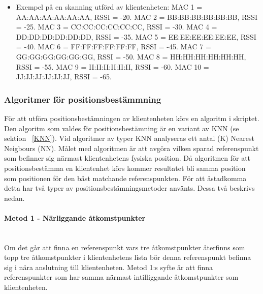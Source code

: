 \documentclass[a4paper,12pt]{article}
\begin{document}
   \begin{itemize}
   \item Exempel på en skanning utförd av klientenheten:
         \newline MAC 1 = AA:AA:AA:AA:AA:AA,  RSSI = -20.
         \newline MAC 2 = BB:BB:BB:BB:BB:BB,  RSSI = -25.
         \newline MAC 3 = CC:CC:CC:CC:CC:CC,  RSSI = -30.
         \newline MAC 4 = DD:DD:DD:DD:DD:DD,  RSSI = -35.
         \newline MAC 5 = EE:EE:EE:EE:EE:EE,  RSSI = -40.
         \newline MAC 6 = FF:FF:FF:FF:FF:FF,  RSSI = -45.
         \newline MAC 7 = GG:GG:GG:GG:GG:GG,  RSSI = -50.
         \newline MAC 8 = HH:HH:HH:HH:HH:HH,  RSSI = -55.
         \newline MAC 9 = II:II:II:II:II:II,  RSSI = -60.
         \newline MAC 10 = JJ:JJ:JJ:JJ:JJ:JJ,  RSSI = -65.
   \end{itemize}

 \subsubsection{Algoritmer för positionsbestämmning}\label{algoritm}
 För att utföra positionsbestämningen av klientenheten körs en algoritm i skriptet. Den algoritm som valdes för positionsbestämning är en variant av KNN (se sektion ~\ref{KNN}). Vid algoritmer av typer KNN analyseras ett antal (K) Nearest Neigbours (NN).
 Målet med algoritmen är att avgöra vilken sparad referenspunkt som befinner sig närmast klientenhetens fysiska position. Då algoritmen för att positionsbestämma en klientenhet körs kommer resultatet bli samma position som positionen för den bäst matchande referenspunkten. För att åstadkomma detta har två typer av positionsbestämningsmetoder använts. Dessa två beskrivs nedan.

 \paragraph{Metod 1 - Närliggande åtkomstpunkter}
 \leavevmode\\
 Om det går att finna en referenspunkt vars tre åtkomstpunkter återfinns som topp tre åtkomstpunkter i klientenhetens lista bör denna referenspunkt befinna sig i nära anslutning till klientenheten.
 Metod 1:s syfte är att finna referenspunkter som har samma närmast intilliggande åtkomstpunkter som klientenheten.
\end{document}
